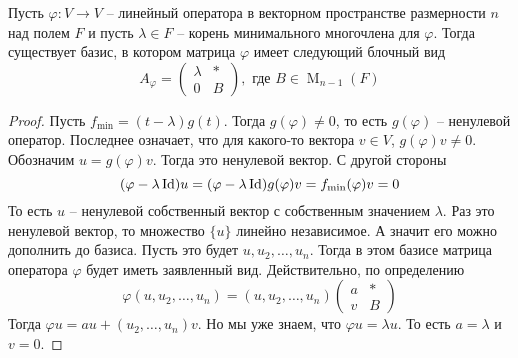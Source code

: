 \begin{claim}
Пусть $\varphi \colon V\to V$ -- линейный оператора в векторном пространстве размерности $n$ над полем $F$ и пусть $\lambda\in F$ -- корень минимального многочлена для $\varphi$.
Тогда существует базис, в котором матрица $\varphi$ имеет следующий блочный вид
\[
A_\varphi = 
\begin{pmatrix}
{\lambda}&{*}\\
{0}&{B}
\end{pmatrix},\text{ где }
B\in \operatorname{M}_{n-1}(F)
\]
\end{claim}
\begin{proof}
Пусть $f_{\text{min}}=(t-\lambda)g(t)$.
Тогда $g(\varphi) \neq 0$, то есть $g(\varphi)$ -- ненулевой оператор.
Последнее означает, что для какого-то вектора $v\in V$, $g(\varphi)v\neq 0$.
Обозначим $u = g(\varphi)v$.
Тогда это ненулевой вектор.
С другой стороны
\[
(\varphi - \lambda \operatorname{Id})u = (\varphi - \lambda \operatorname{Id})g(\varphi)v = f_\text{min}(\varphi)v = 0
\]
То есть $u$ -- ненулевой собственный вектор с собственным значением $\lambda$.
Раз это ненулевой вектор, то множество $\{u\}$ линейно независимое.
А значит его можно дополнить до базиса.
Пусть это будет $u,u_2,\ldots,u_n$.
Тогда в этом базисе матрица оператора $\varphi$ будет иметь заявленный вид.
Действительно, по определению
\[
\varphi(u, u_2,\ldots, u_n) = (u, u_2,\ldots,u_n)
\begin{pmatrix}
{a}&{*}\\
{v}&{B}
\end{pmatrix}
\]
Тогда $\varphi u = a u + (u_2, \ldots, u_n)v$.
Но мы уже знаем, что $\varphi u = \lambda u$.
То есть $a = \lambda$ и $v = 0$.
\end{proof}

